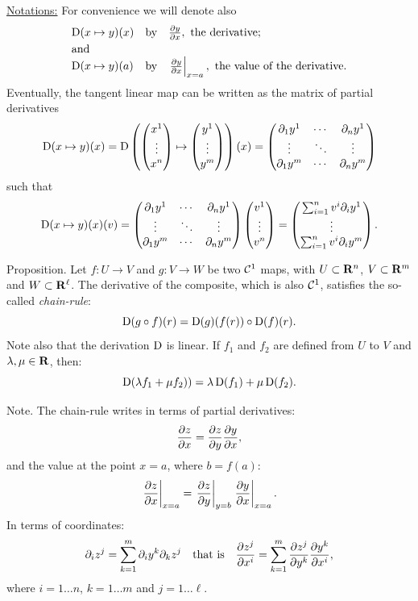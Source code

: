 \underline{Notations:} For convenience we will denote also
$$%
  \begin{array}{lll}
  \Der(x\mapsto y)(x) & \text{by}  &  {\partial y \over \partial x}, \text{ the derivative}; \\[0.1cm]
  \text{and}        &            & \\[0.0cm]
  \Der(x\mapsto y)(a) & \text{by} &  \left.{\partial y \over \partial x}\right|_{x=a}, \text{ the value of the derivative}.
  \end{array}
  $$%
Eventually,
the tangent linear map can be written as the matrix of partial derivatives
$$%
  \Der(x\mapsto y)(x) = \Der\left(\Vector{x^1 \\ \vdots \\ x^n} \mapsto \Vector{y^1 \\ \vdots \\ y^m}\right)(x)
  = \Vector{\partial_1 y^1 & \cdots & \partial_n y^1 \\
  \vdots & \ddots & \vdots \\
  \partial_1 y^m & \cdots & \partial_n y^m
  }
  $$%
such that
$$%
  \Der(x\mapsto y)(x)(v) = \Vector{\partial_1 y^1 & \cdots & \partial_n y^1 \\
  \vdots & \ddots & \vdots \\
  \partial_1 y^m & \cdots & \partial_n y^m
  }\Vector{v^1 \\ \vdots \\ v^n}
  = \Vector{\sum_{i=1}^n v^i \partial_i y^1 \\ \vdots \\ \sum_{i=1}^n v^i \partial_i y^m}.
  $$%
\begin{Article}{Proposition.}{\itshape}
  Let $f \colon  U \to V$ and $g \colon V \to W$ be two ${\mathcal{C}}^{1}$ maps,
  with $U \subset \mathbf{R}^n$,
  $V \subset \mathbf{R}^m$ and $W \subset \mathbf{R}^\ell$.
  The derivative of the composite,
  which is also ${\mathcal{C}}^{1}$,
  satisfies the so-called \emph{chain-rule}:
  $$%
    \Der(g \circ f)(r) = \Der(g)(f(r)) \circ \Der(f)(r).
    $$%
  Note also that the derivation $\operatorname{D}$ is linear.
  If $f_1$ and $f_2$ are defined from $U$ to $V$ and $\lambda, \mu \in \mathbf{R}$,
  then:
  $$%
    \Der(\lambda f_1 + \mu f_2)) = \lambda \Der(f_1) + \mu \Der(f_2).
    $$%
\end{Article}
%
\begin{Article}{Note.}{}
  The chain-rule writes in terms of partial derivatives:
  $$%
    {\partial z \over \partial x} = {\partial z \over \partial y} {\partial y \over \partial x},
    $$%
  and the value at the point $x=a$,
  where $b = f(a)$:
  $$%
    \left.{\partial z \over \partial x}\right|_{x=a} =
    \left.{\partial z \over \partial y}\right|_{y=b} \left.{\partial y \over \partial x}\right|_{x=a}.
    $$%
  In terms of coordinates:
  $$%
    \partial_i z^j = \sum_{k=1}^m \partial_i y^k \partial_k z^j
    \quad \text{that is} \quad
    {\partial z^j \over \partial x^i} = \sum_{k=1}^m {\partial z^j \over \partial y^k} {\partial y^k \over \partial x^i},
    $$%
  where $i = 1 \dots n$,
  $k = 1 \dots m$ and $j = 1 \dots \ell$.
\end{Article}
